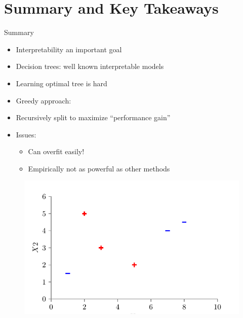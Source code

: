 \documentclass[usenames,dvipsnames]{beamer}
\begin{document}
\section{Summary and Key Takeaways}

\begin{frame}{Summary}
\begin{itemize}
	\item Interpretability an important goal
\item Decision trees: well known interpretable models
\item  Learning optimal tree is hard
\item  Greedy approach:
\item  Recursively split to maximize “performance gain”
\item  Issues:
\begin{itemize}
	\item Can overfit easily!
	\item  Empirically not as powerful as other methods
\end{itemize}
\end{itemize}

\end{frame}


\begin{frame}

	\begin{figure}
		\centering
		\includegraphics{../assets/decision-trees/figures/dt_weighted/fig1.pdf}
	\end{figure}
	
	
	\end{frame}
	
\end{document}
